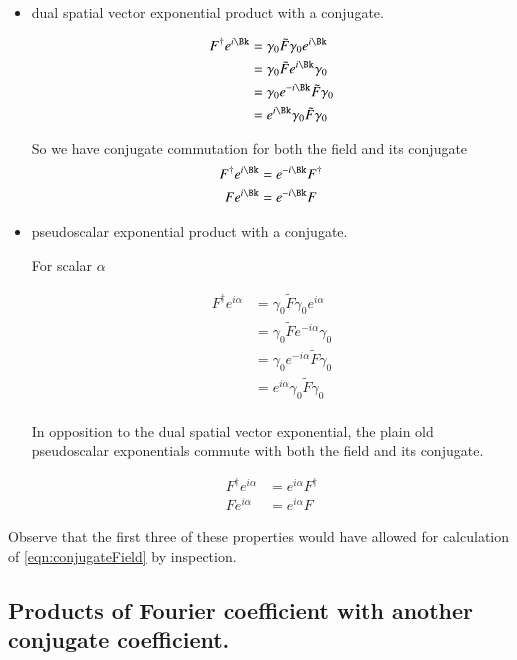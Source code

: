 \documentclass{article}
\begin{document}
\begin{itemize}
\item dual spatial vector exponential product with a conjugate.

\begin{align*}
F^\dagger  e^{i\Bk} 
&= \gamma_0 \tilde{F} \gamma_0 e^{i\Bk} \\
&= \gamma_0 \tilde{F} e^{i\Bk} \gamma_0 \\
&= \gamma_0 e^{-i\Bk} \tilde{F} \gamma_0 \\
&= e^{i\Bk} \gamma_0 \tilde{F} \gamma_0 \\
\end{align*}

So we have conjugate commutation for both the field and its conjugate
\begin{align}
F^\dagger e^{i\Bk} &= e^{-i\Bk} F^\dagger \\
F e^{i\Bk} &= e^{-i\Bk} F
\end{align}

\item pseudoscalar exponential product with a conjugate.

For scalar $\alpha$

\begin{align*}
F^\dagger  e^{i\alpha} 
&= \gamma_0 \tilde{F} \gamma_0 e^{i\alpha} \\
&= \gamma_0 \tilde{F} e^{-i\alpha} \gamma_0 \\
&= \gamma_0 e^{-i\alpha} \tilde{F} \gamma_0 \\
&= e^{i\alpha} \gamma_0 \tilde{F} \gamma_0 \\
\end{align*}

In opposition to the dual spatial vector exponential, the plain old pseudoscalar exponentials commute with 
both the field and its conjugate.

\begin{align}
F^\dagger e^{i\alpha} &= e^{i\alpha} F^\dagger \\
F e^{i\alpha} &= e^{i\alpha} F
\end{align}

\end{itemize}

Observe that the first three of these properties would have allowed for calculation of 
\ref{eqn:conjugateField} by inspection.

\subsection{ Products of Fourier coefficient with another conjugate coefficient. }
\end{document}
